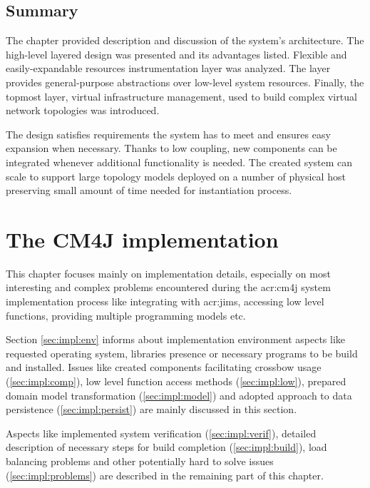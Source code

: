 \documentclass[11pt]{book}
\begin{document}
    \section*{Summary}


      The chapter provided description and discussion of the system's architecture. The high-level layered design was
      presented and its advantages listed. Flexible and easily-expandable resources instrumentation layer was analyzed.
      The layer provides general-purpose abstractions over low-level system resources.  Finally, the topmost layer,
      virtual infrastructure management, used to build complex virtual network topologies was introduced.

      The design satisfies requirements the system has to meet and ensures easy expansion when necessary. Thanks to low
      coupling, new components can be integrated whenever additional functionality is needed. The created system can
      scale to support large topology models deployed on a number of physical host preserving small amount of time
      needed for instantiation process.


  \chapter{The CM4J implementation}
  \label{chap:impl}

    This chapter focuses mainly on implementation details, especially on most interesting and complex problems
    encountered during the \gls{acr:cm4j} system implementation process  like integrating with \gls{acr:jims}, accessing
    low level functions, providing multiple programming models etc.

    Section \ref{sec:impl:env} informs about implementation environment aspects like requested operating system,
    libraries presence or necessary programs to be build and installed. Issues like created components facilitating
    crossbow usage (\ref{sec:impl:comp}), low level function access methods (\ref{sec:impl:low}), prepared domain model
    transformation (\ref{sec:impl:model}) and adopted approach to data persistence (\ref{sec:impl:persist}) are mainly
    discussed in this section.

    Aspects like implemented system verification (\ref{sec:impl:verif}), detailed description of necessary steps for
    build completion (\ref{sec:impl:build}), load balancing problems and other potentially hard to solve issues
    (\ref{sec:impl:problems}) are described in the remaining part of this chapter.
\end{document}
